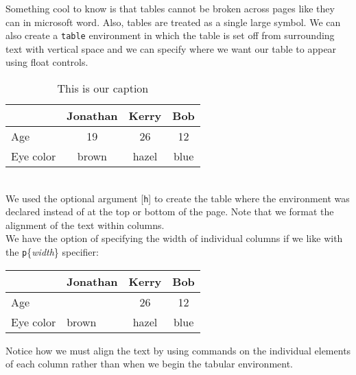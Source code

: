 \documentclass[12pt]{amsart}
\theoremstyle{plain}
\newtheorem{name of environment}{Typeset Proclamation} %
\newtheorem*{no numbering}{No Numbering}
\theoremstyle{definition}
\theoremstyle{remark}
\begin{document}
Something cool to know is that tables cannot be broken across pages like they can in microsoft word. Also, tables are treated as a single large symbol. We can also create a \texttt{table} environment in which the table is set off from surrounding text with vertical space and we can specify where we want our table to appear using float controls.
\begin{table}[h]
	\begin{center}
		\begin{tabular}{| l | c | c | c|} %
		\hline %
		{}	& Jonathan 	& Kerry	& Bob \\ \hline
		Age 	& 19 		& 26 		& 12  \\ \hline
		Eye color 	& brown 	& hazel 	& blue \\ \hline
		\end{tabular}
		\caption{This is our caption} \label{table1}
	\end{center}
\end{table}
\\We used the optional argument [\texttt{h}] to create the table where the environment was declared instead of at the top or bottom of the page. Note that we format the alignment of the text within columns. 
\\
We have the option of specifying the width of individual columns if we like with the \texttt{p}\{\emph{width}\} specifier: \\
\begin{center}
	\begin{tabular}{| l | p{2in} | c | c|} %
	\hline 
		& \centering Jonathan 	& Kerry	& Bob \\ \hline
	Age 	& \centering 19 		& 26 		& 12  \\ \hline
	Eye color 	& \centering brown 	& hazel 	& blue \\ \hline
	\end{tabular}
\end{center}
Notice how we must align the text by using commands on the individual elements of each column rather than when we begin the tabular environment.
\end{document}
